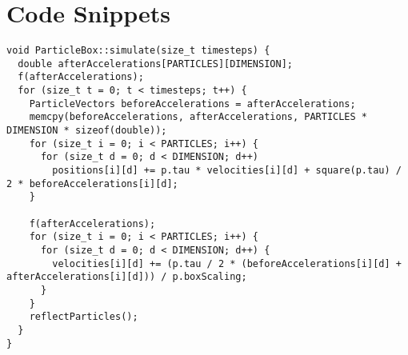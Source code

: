 \chapter{Code Snippets}
\label{appendix:code-snippets}
\begin{verbatim}
void ParticleBox::simulate(size_t timesteps) {
  double afterAccelerations[PARTICLES][DIMENSION];
  f(afterAccelerations);
  for (size_t t = 0; t < timesteps; t++) {
    ParticleVectors beforeAccelerations = afterAccelerations;
    memcpy(beforeAccelerations, afterAccelerations, PARTICLES * DIMENSION * sizeof(double));
    for (size_t i = 0; i < PARTICLES; i++) {
      for (size_t d = 0; d < DIMENSION; d++)
        positions[i][d] += p.tau * velocities[i][d] + square(p.tau) / 2 * beforeAccelerations[i][d];
    }

    f(afterAccelerations);
    for (size_t i = 0; i < PARTICLES; i++) {
      for (size_t d = 0; d < DIMENSION; d++) {
        velocities[i][d] += (p.tau / 2 * (beforeAccelerations[i][d] + afterAccelerations[i][d])) / p.boxScaling;
      }
    }
    reflectParticles();
  }
}
\end{verbatim}
